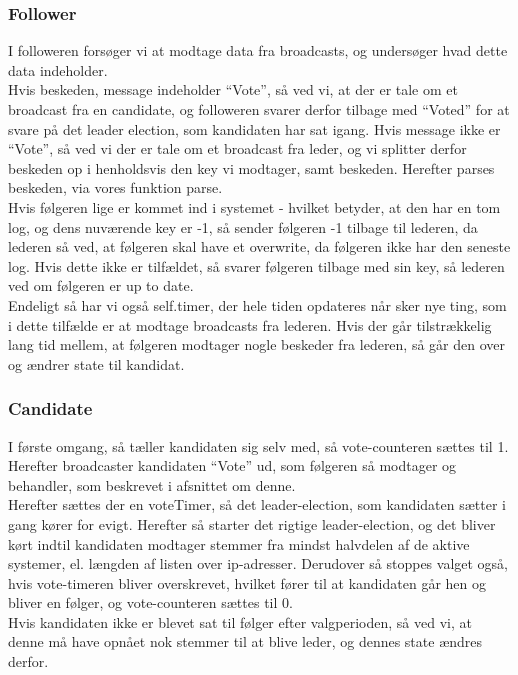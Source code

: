 \documentclass[a4paper,12pt]{article}
\begin{document}
\subsubsection{Follower}
I followeren forsøger vi at modtage data fra broadcasts, og undersøger hvad dette data indeholder.
\\
Hvis beskeden, message indeholder “Vote”, så ved vi, at der er tale om et broadcast fra en candidate, og followeren svarer derfor tilbage med “Voted” for at svare på det leader election, som kandidaten har sat igang.
Hvis message ikke er “Vote”, så ved vi der er tale om et broadcast fra leder, og vi splitter derfor beskeden op i henholdsvis den key vi modtager, samt beskeden.
Herefter parses beskeden, via vores funktion parse.
\\
Hvis følgeren lige er kommet ind i systemet - hvilket betyder, at den har en tom log, og dens nuværende key er -1, så sender følgeren -1 tilbage til lederen, da lederen så ved, at følgeren skal have et overwrite, da følgeren ikke har den seneste log.
Hvis dette ikke er tilfældet, så svarer følgeren tilbage med sin key, så lederen ved om følgeren er up to date.
\\[5px]
Endeligt så har vi også self.timer, der hele tiden opdateres når sker nye ting, som i dette tilfælde er at modtage broadcasts fra lederen.
Hvis der går tilstrækkelig lang tid mellem, at følgeren modtager nogle beskeder fra lederen, så går den over og ændrer state til kandidat.


\subsubsection{Candidate}
I første omgang, så tæller kandidaten sig selv med, så vote-counteren sættes til 1.
Herefter broadcaster kandidaten “Vote” ud, som følgeren så modtager og behandler, som beskrevet i afsnittet om denne.
\\
Herefter sættes der en voteTimer, så det leader-election, som kandidaten sætter i gang kører for evigt.
Herefter så starter det rigtige leader-election, og det bliver kørt indtil kandidaten modtager stemmer fra mindst halvdelen af de aktive systemer, el. længden af listen over ip-adresser. Derudover så stoppes valget også, hvis vote-timeren bliver overskrevet, hvilket fører til at kandidaten går hen og bliver en følger, og vote-counteren sættes til 0.
\\
Hvis kandidaten ikke er blevet sat til følger efter valgperioden, så ved vi, at denne må have opnået nok stemmer til at blive leder, og dennes state ændres derfor.
\end{document}
